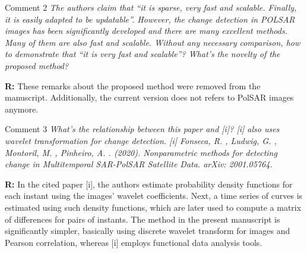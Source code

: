 \documentclass[11pt]{report}
\begin{document}
\vspace{0.3cm}

\medskip
\begin{mybox}{Comment 2}
\textit{The authors claim that “it is sparse, very fast and scalable. Finally, it is easily adapted to be updatable”. However, the
change detection in POLSAR images has been significantly developed and there are many excellent methods. Many of
them are also fast and scalable. Without any necessary comparison, how to demonstrate that “it is very fast and scalable”? What’s the novelty of the proposed method?}

\medskip

\textbf{R:} These remarks about the proposed method were removed from the manuscript. Additionally, the current version does not refers to PolSAR images anymore.

\medskip

\end{mybox}

\vspace{0.3cm}


\medskip
\begin{mybox}{Comment 3}
\textit{What’s the relationship between this paper and [i]? [i] also uses wavelet transformation for change detection.
[i] Fonseca, R. , Ludwig, G. , Montoril, M. , Pinheiro, A. . (2020). Nonparametric methods for detecting change in Multitemporal SAR-PolSAR Satellite Data. arXiv: 2001.05764.}

\medskip

\textbf{R:} In the cited paper [i], the authors estimate probability density functions for each instant using the images' wavelet coefficients. Next, a time series of curves is estimated using such density functions, which are later used to compute a matrix of differences for pairs of instants. The method in the present manuscript is significantly simpler, basically using discrete wavelet transform for images and Pearson correlation, whereas [i] employs functional data analysis tools. 

\medskip


\end{mybox}

\vspace{0.3cm}
\end{document}

